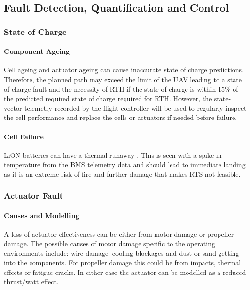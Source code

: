 \subsection{Fault Detection, Quantification and Control}

\subsubsection{State of Charge}
\paragraph{Component Ageing}
Cell ageing and actuator ageing can cause inaccurate state of charge predictions. Therefore, the planned path may exceed the limit of the \gls{UAV} leading to a state of charge fault and the necessity of \gls{RTH} if the state of charge is within 15\% of the predicted required state of charge required for \gls{RTH}. However, the state-vector telemetry recorded by the flight controller will be used to regularly inspect the cell performance and replace the cells or actuators if needed before failure.
\paragraph{Cell Failure}
\gls{LiON} batteries can have a thermal runaway \cite{REF}. This is seen with a spike in temperature from the \gls{BMS} telemetry data and should lead to immediate landing as it is an extreme risk of fire and further damage\cite{REF} that makes \gls{RTS} not feasible.

\subsubsection{Actuator Fault}
\paragraph{Causes and Modelling}
A loss of actuator effectiveness can be either from motor damage or propeller damage. The possible causes of motor damage specific to the operating environments include: wire damage, cooling blockages and dust or sand getting into the components. For propeller damage this could be from impacts, thermal effects or fatigue cracks. In either case the actuator can be modelled as a reduced thrust/watt effect.
